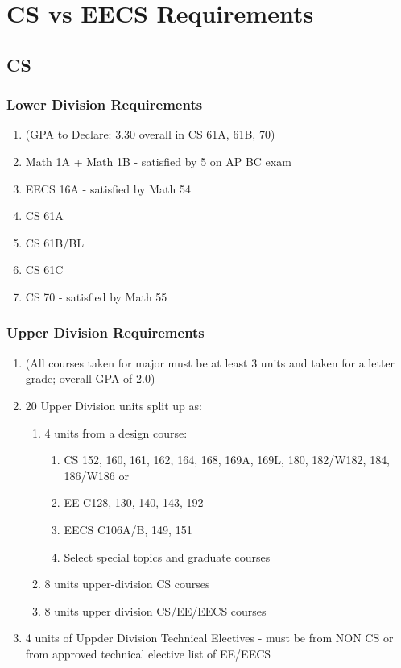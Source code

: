 \chapter{CS vs EECS Requirements}

\section{CS}

\subsection{Lower Division Requirements}

\begin{enumerate}
    \item (GPA to Declare: 3.30 overall in CS 61A, 61B, 70)
    \item Math 1A + Math 1B - satisfied by 5 on AP BC exam
    \item EECS 16A - satisfied by Math 54
    \item CS 61A
    \item CS 61B/BL
    \item CS 61C
    \item CS 70 - satisfied by Math 55
\end{enumerate}

\subsection{Upper Division Requirements}

\begin{enumerate}
    \item (All courses taken for major must be at least 3 units and taken for a letter grade; overall GPA of 2.0)
    \item 20 Upper Division units split up as:
    \begin{enumerate}
        \item 4 units from a design course:
        \begin{enumerate}
            \item CS 152, 160, 161, 162, 164, 168, 169A, 169L, 180, 182/W182, 184, 186/W186 or
            \item EE C128, 130, 140, 143, 192
            \item EECS C106A/B, 149, 151
            \item Select special topics and graduate courses
        \end{enumerate}
        \item 8 units upper-division CS courses
        \item 8 units upper division CS/EE/EECS courses
    \end{enumerate}
    \item 4 units of Uppder Division Technical Electives - must be from NON CS or from approved technical elective list of EE/EECS
\end{enumerate}

